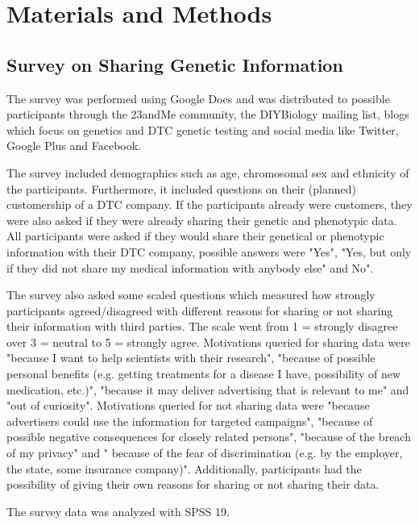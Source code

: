 \documentclass[10pt]{article}
\begin{document}
\section*{Materials and Methods}
\subsection*{Survey on Sharing Genetic Information}
The survey was performed using Google Docs and was distributed to possible participants through the 23andMe community, the DIYBiology mailing list, 
blogs which focus on genetics and DTC genetic testing and social media like Twitter, Google Plus and Facebook.  

The survey included demographics such as age, chromosomal sex and ethnicity of the participants. Furthermore, it included questions on their 
(planned) customership of a DTC company. If the participants already were customers, they were also asked if they were already sharing their genetic and phenotypic data. 
All participants were asked if they would share their genetical or phenotypic information with their DTC company, possible answers were "Yes", "Yes, 
but only if they did not share my medical information with anybody else" and No".

The survey also asked some scaled questions which measured how strongly participants agreed/disagreed with different reasons for sharing or not sharing their 
information with third parties. The scale went from 1 = strongly disagree over 3 = neutral to  5 = strongly agree. Motivations queried for sharing data 
were "because I want to help scientists with their research", "because of possible personal benefits (e.g. getting treatments for a disease I have, 
possibility of new medication, etc.)", "because it may deliver advertising that is relevant to me" and "out of curiosity". Motivations queried for not sharing 
data were "because advertisers could use the information for targeted campaigns", "because of possible negative consequences for closely related persons", 
"because of the breach of my privacy" and " because of the fear of discrimination (e.g. by the employer, the state, some insurance company)". 
Additionally, participants had the possibility of giving their own reasons for sharing or not sharing their data.

The survey data was analyzed with SPSS 19. 
\end{document}
